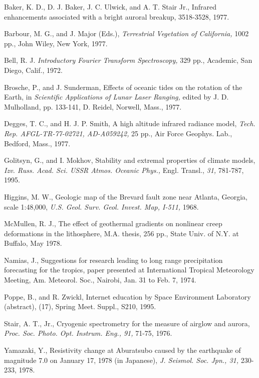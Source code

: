 \begin{article}
\begin{references}
Baker, K. D., D. J. Baker, J. C. Ulwick, and A. T. 
Stair Jr., Infrared enhancements associated with a 
bright auroral breakup,  
3518-3528, 1977.

Barbour, M. G., and J. Major (Eds.), {\it Terrestrial 
Vegetation of California,} 1002 pp., John Wiley, New 
York, 1977.

Bell, R. J. {\it Introductory Fourier Transform 
Spectroscopy,} 329 pp., Academic, San Diego, Calif., 
1972.

Brosche, P., and J. Sunderman, Effects of oceanic 
tides on the rotation of the Earth, in {\it Scientific 
Applications of Lunar Laser Ranging,} edited by J. D. 
Mulholland, pp. 133-141, D. Reidel, Norwell, Mass., 1977.

Degges, T. C., and H. J. P. Smith, A high altitude 
infrared radiance model, {\it Tech. Rep. AFGL-TR-77-02721, 
AD-A059242,} 25 pp., Air Force Geophys. Lab., Bedford, 
Mass., 1977.

Golitsyn, G., and I. Mokhov, Stability and extremal 
properties of climate models, {\it Izv. Russ. Acad. Sci. 
USSR Atmos. Oceanic Phys.,} Engl. Transl., {\it 31,} 
781-787, 1995.

Higgins, M. W., Geologic map of the Brevard fault 
zone near Atlanta, Georgia, scale 1:48,000, {\it U.S. 
Geol. Surv. Geol. Invest. Map, I-511,} 1968.

McMullen, R. J., The effect of geothermal gradients on 
nonlinear creep deformations in the lithosphere, M.A. 
thesis, 256 pp., State Univ. of N.Y. at Buffalo, May 1978.

Namias, J., Suggestions for research leading to long range 
precipitation forecasting for the tropics, paper presented 
at International Tropical Meteorology Meeting, Am. Meteorol.
Soc., Nairobi, Jan. 31 to Feb. 7, 1974.

Poppe, B., and R. Zwickl, Internet education by Space 
Environment Laboratory (abstract), (17), 
Spring Meet. Suppl., S210, 1995.

Stair, A. T., Jr., Cryogenic spectrometry for the measure 
of airglow and aurora, {\it Proc. Soc. Photo. Opt. Instrum. 
Eng., 91,} 71-75, 1976.

Yamazaki, Y., Resistivity change at Aburatsubo caused by 
the earthquake of magnitude 7.0 on January 17, 1978 (in 
Japanese), {\it J. Seismol. Soc. Jpn., 31,} 230-233, 1978.
\end{references}

\end{article}

